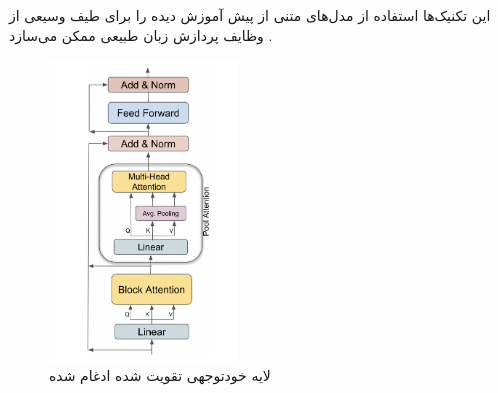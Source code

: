 این تکنیک‌ها استفاده از مدل‌های متنی از پیش آموزش دیده را برای طیف وسیعی از وظایف پردازش زبان طبیعی ممکن می‌سازد
\cite{Xiong2022AdaptingPT}.
\begin{figure}[!h]
	\begin{center}
		\includegraphics[height=8cm]{pooling_attention.png}
	\end{center}
	\caption{ لایه خودتوجهی تقویت شده ادغام شده \cite{Xiong2022AdaptingPT}}
	\label{fig:attention_pooling}
	\medskip
	\small
\end{figure}













